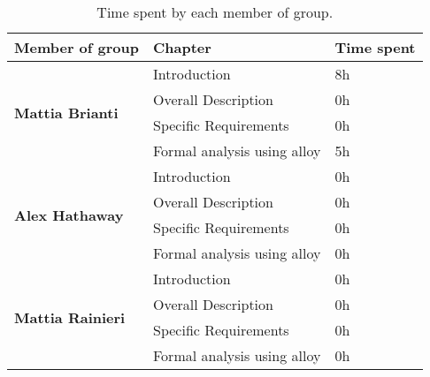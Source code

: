 \begin{table}[H]
      \centering
      \begin{tabular}{|l|l|l|}
            \hline
            \textbf{Member of group }                  & \textbf{Chapter}            & \textbf{Time spent} \\\hline
            \multirow{4}{*}{\textbf{Mattia Brianti}} & Introduction                & 8h                  \\
                                                       & Overall Description         & 0h                \\
                                                       & Specific Requirements       & 0h                 \\
                                                       & Formal analysis using alloy & 5h                 \\\hline
            \multirow{4}{*}{\textbf{Alex Hathaway}} & Introduction                & 0h                  \\
                                                       & Overall Description         & 0h                  \\
                                                       & Specific Requirements       & 0h                  \\
                                                       & Formal analysis using alloy & 0h                  \\\hline
            \multirow{4}{*}{\textbf{Mattia Rainieri}} & Introduction                & 0h                  \\
                                                       & Overall Description         & 0h                 \\
                                                       & Specific Requirements       & 0h                  \\
                                                       & Formal analysis using alloy & 0h                \\\hline
      \end{tabular}
      \caption{Time spent by each member of group.}
      \label{table:Time spent}
\end{table}
